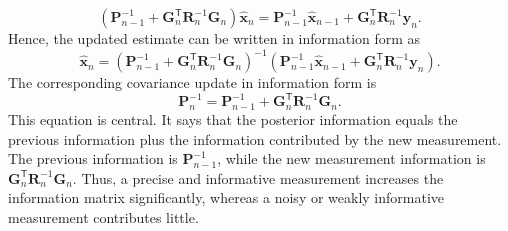 \begin{equation*}
\left(\mathbf{P}_{n-1}^{-1}+\mathbf{G}_n^{\mathsf T}\mathbf{R}_n^{-1}\mathbf{G}_n\right)\widehat{\mathbf{x}}_n = \mathbf{P}_{n-1}^{-1}\widehat{\mathbf{x}}_{n-1} +\mathbf{G}_n^{\mathsf T}\mathbf{R}_n^{-1}\mathbf{y}_n.
\end{equation*}
Hence, the updated estimate can be written in information form as
\begin{equation}
\widehat{\mathbf{x}}_n = \left( \mathbf{P}_{n-1}^{-1} + \mathbf{G}_n^{\mathsf T} \mathbf{R}_n^{-1} \mathbf{G}_n \right)^{-1} \left( \mathbf{P}_{n-1}^{-1} \widehat{\mathbf{x}}_{n-1} + \mathbf{G}_n^{\mathsf T} \mathbf{R}_n^{-1} \mathbf{y}_n \right).
\end{equation}
The corresponding covariance update in information form is
\begin{equation}
\mathbf{P}_n^{-1}
=
\mathbf{P}_{n-1}^{-1}
+
\mathbf{G}_n^{\mathsf T}
\mathbf{R}_n^{-1}
\mathbf{G}_n.
\end{equation}
This equation is central. It says that the posterior information equals the previous information plus the information contributed by the new measurement. The previous information is $\mathbf{P}_{n-1}^{-1}$, while the new measurement information is $\mathbf{G}_n^{\mathsf T}\mathbf{R}_n^{-1}\mathbf{G}_n$. Thus, a precise and informative measurement increases the information matrix significantly, whereas a noisy or weakly informative measurement contributes little.

